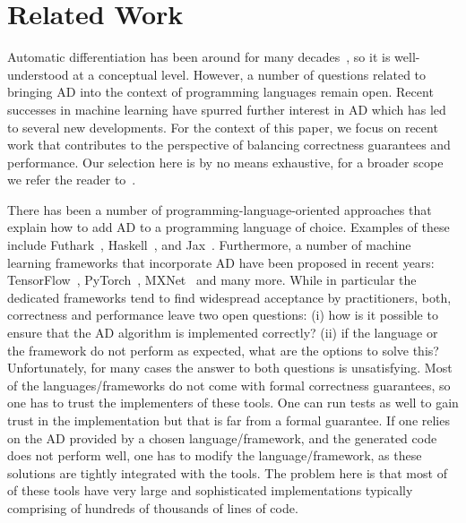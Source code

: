 \section{Related Work\label{sec:relatedwork}}


Automatic differentiation has been around for many decades~\cite{early-ad1, early-ad2},
so it is well-understood at a conceptual level.  However,
a number of questions related to bringing AD into the context of
programming languages remain open.  Recent successes in machine learning
have spurred further interest in AD which has led to several new developments.
For the context of this paper, we focus on recent work that contributes to 
the perspective of balancing correctness guarantees and performance.
Our selection here is by no means exhaustive, for
a broader scope we refer the reader to~\cite{autodiff-survey}.

There has been a number of programming-language-oriented approaches that explain
how to add AD to a programming language of choice. Examples of these include
Futhark~\cite{futhark/sc22ad}, Haskell~\cite{ad-haskell}, and
Jax~\cite{ad-jax}. Furthermore, a number of machine learning
frameworks that incorporate AD have been proposed in recent years: TensorFlow~\cite{ad-tf},
PyTorch~\cite{ad-pytorch}, MXNet~\cite{ad-mxnet} and many more.
While in particular the dedicated frameworks tend to find widespread 
acceptance by practitioners, both, correctness and performance leave
two open questions: (i) how is it possible to
ensure that the AD algorithm is implemented correctly?
(ii) if the
language or the framework do not perform as expected, what are the
options to solve this?  Unfortunately, for many cases the answer to
both questions is unsatisfying.  Most of the languages/frameworks do not
come with formal correctness guarantees, so one has to trust the
implementers of these tools.  One can run tests as well to gain trust 
in the implementation but that is far from a 
formal guarantee.  If one relies
on the AD provided by a chosen language/framework, and the generated code does not
perform well, one has to modify the language/framework, as these solutions
are tightly integrated with the tools. The problem here is that most of of these tools
have very large and sophisticated implementations typically comprising
of hundreds of thousands of lines of code.

